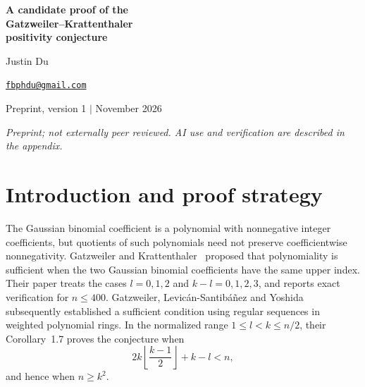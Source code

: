 \documentclass[11pt,a4paper]{article}
\numberwithin{equation}{section}
\theoremstyle{remark}
\newcommand{\floor}[1]{\left\lfloor #1\right\rfloor}
\begin{document}
\begin{center}
  {\fontsize{24}{29}\selectfont\bfseries A candidate proof of the\\[4pt]
  Gatzweiler--Krattenthaler\\[4pt]
  positivity conjecture\par}
  \vspace{10pt}
  {\large Justin Du\par}
  \vspace{5pt}
  \href{mailto:fbphdu@gmail.com}{\texttt{fbphdu@gmail.com}}\par
  \vspace{10pt}
  Preprint, version 1 \quad$\vert$ November 2026
\end{center}
\vspace{5pt}

\begin{abstract}
Gatzweiler and Krattenthaler conjectured that a polynomial quotient of two
Gaussian binomial coefficients with the same upper index has nonnegative
coefficients. We present a candidate proof for the complete parameter range.
After cancellation, polynomiality gives divisibility-count inequalities for
two separated integer intervals of equal length. We prove that every subset
of the lower interval generates at least as many elements of the upper
interval in its additive semigroup. The criterion of Gatzweiler,
Levic\'an-Santib\'a\~nez and Yoshida then supplies a regular sequence whose
Hilbert series is the required quotient. The central lemma uses a mixed
sumset modulo the largest generator not exceeding the interval length.
Kneser's theorem, together with separate capacities for the lower and upper
generators, handles all stabilizers and all collisions of residues.
Two-generator representations treat subsets near the upper endpoint.
A second sumset estimate handles small lower indices, and a necessary
inequality from polynomiality leaves only two explicit boundary families.
The proof has no finite parameter cutoff; exact computations are supplied
as supplementary checks.
\end{abstract}

{\small\itshape Preprint; not externally peer reviewed.
AI use and verification are described in the appendix.}

\section*{Introduction and proof strategy}

The Gaussian binomial coefficient is a polynomial with nonnegative integer
coefficients, but quotients of such polynomials need not preserve
coefficientwise nonnegativity. Gatzweiler and Krattenthaler~\cite{GK}
proposed that polynomiality is sufficient when the two Gaussian binomial
coefficients have the same upper index. Their paper treats the cases
$l=0,1,2$ and $k-l=0,1,2,3$, and reports exact verification for $n\le 400$.
Gatzweiler, Levic\'an-Santib\'a\~nez and Yoshida~\cite{GLY} subsequently
established a sufficient condition using regular sequences in weighted
polynomial rings. In the normalized range $1\le l<k\le n/2$, their
Corollary~1.7 proves the conjecture when
\[
  2k\floor{\frac{k-1}{2}}+k-l<n,
\]
and hence when $n\ge k^2$.
\end{document}
